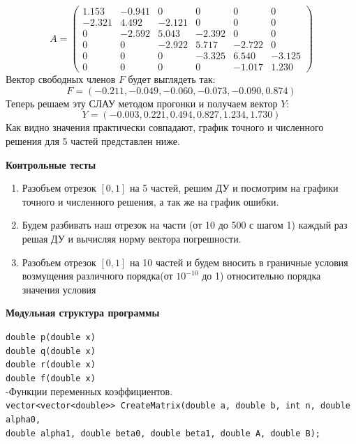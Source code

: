 \documentclass{article}
\begin{document}
	\begin{equation}
		A = \left(
		\begin{array}{cccccc}
			1.153 & -0.941 & 0 & 0 & 0 & 0\\
			-2.321 & 4.492 & -2.121 & 0 & 0 & 0\\
			0 & -2.592 & 5.043 & -2.392 & 0 & 0\\
			0 & 0 & -2.922 & 5.717 & -2.722 & 0\\
			0 & 0 & 0 & -3.325 & 6.540 & -3.125\\
			0 & 0 & 0 & 0 & -1.017 & 1.230
		\end{array}
		\right)
	\end{equation}
	Вектор свободных членов $F$ будет выглядеть так:
	\begin{equation}
		F = (-0.211, -0.049, -0.060, -0.073, -0.090, 0.874)
	\end{equation}
	Теперь решаем эту СЛАУ методом прогонки и получаем вектор $Y$:
	\begin{equation}
		Y = (-0.003, 0.221, 0.494, 0.827, 1.234, 1.730)
	\end{equation}
	Как видно значения практически совпадают, график точного и численного решения для 5 частей представлен ниже.
	\begin{center} \textbf{Контрольные тесты}\end{center}
	\begin{enumerate}
		\item Разобъем отрезок $[0,1]$ на 5 частей, решим ДУ и посмотрим на графики точного и численного решения, а так же на график ошибки.
		\item Будем разбивать наш отрезок на части (от 10 до 500 с шагом 1) каждый раз решая ДУ и вычисляя норму вектора погрешности.
		\item Разобъем отрезок $[0,1]$ на 10 частей и будем вносить в граничные условия возмущения различного порядка(от $10^{-10}$ до 1) относительно порядка значения условия
	\end{enumerate}
	\begin{center} \textbf{Модульная структура программы}\end{center}
	\verb|double p(double x)|\\
	\verb|double q(double x)|\\
	\verb|double r(double x)|\\
	\verb|double f(double x)|\\
	-Функции переменных коэффициентов.\\
	\verb|vector<vector<double>> CreateMatrix(double a, double b, int n, double alpha0,|\\ \verb|double alpha1, double beta0, double beta1, double A, double B);|\\
\end{document}
